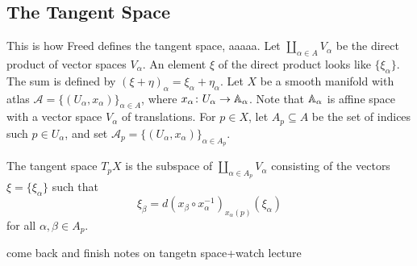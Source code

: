 \subsection{The Tangent Space}
This is how Freed defines the tangent space, aaaaa. Let $\underset{\alpha \in A}{\coprod} V_{\alpha }$ be the direct product of vector spaces $V_{\alpha }.$ An element $\xi$ of the direct product looks like $\{\xi_{\alpha }\} .$ The sum is defined by $(\xi+\eta)_{\alpha }=\xi _{\alpha }+\eta _{\alpha }$. Let $X$ be a smooth manifold with atlas $\mathscr{A} =\{(U_{\alpha },x_{\alpha })\} _{\alpha \in A}$, where $x_{\alpha }\colon U_{\alpha }\to  \mathbb{A}_{\alpha } $. Note that $\mathbb{A}_{\alpha }$ is affine space with a vector space $V_{\alpha }$ of translations. For $p \in X$, let $A_p \subseteq A$ be the set of indices such $p \in U_{\alpha }$, and set $\mathscr A_p= \{(U_{\alpha },x_{\alpha })\} _{\alpha \in A_p}$.
\begin{definition}[]
    The tangent space $T_pX$ is the subspace of $\underset{\alpha \in A_p}{\coprod} V_{\alpha }$ consisting of the vectors $\xi =\{\xi _{\alpha }\} $ such that \[
        \xi _{\beta }=d (x_{\beta }\circ x_{\alpha }^{-1})_{x_{\alpha }(p)}(\xi_{\alpha })
    \] for all $\alpha ,\beta \in A_p$.
\end{definition} {\color{red} come back and finish notes on tangetn space+watch lecture}
